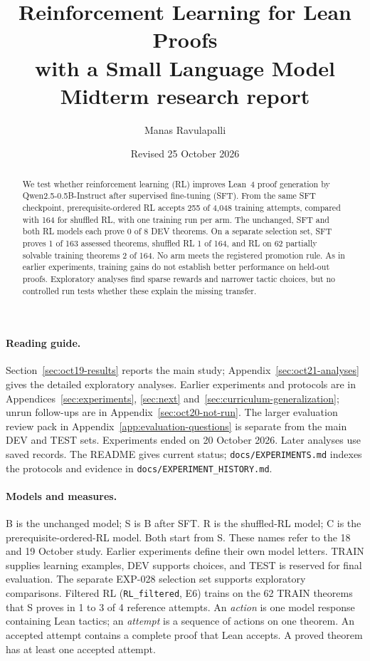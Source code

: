 \documentclass[11pt]{article}
\title{Reinforcement Learning for Lean Proofs\\with a Small Language Model\\[4pt]
\large Midterm research report}
\author{Manas Ravulapalli}
\date{Revised 25 October 2026}
\newcommand{\code}[1]{\texttt{#1}}
\newcommand{\pth}[1]{\nolinkurl{#1}}
\begin{document}
\maketitle

\begin{abstract}
We test whether reinforcement learning (RL) improves Lean~4 proof generation by Qwen2.5-0.5B-Instruct after supervised fine-tuning (SFT).
From the same SFT checkpoint, prerequisite-ordered RL accepts 255 of 4,048 training attempts, compared with 164 for shuffled RL, with one training run per arm.
The unchanged, SFT and both RL models each prove 0 of 8 DEV theorems.
On a separate selection set, SFT proves 1 of 163 assessed theorems, shuffled RL 1 of 164, and RL on 62 partially solvable training theorems 2 of 164.
No arm meets the registered promotion rule.
As in earlier experiments, training gains do not establish better performance on held-out proofs.
Exploratory analyses find sparse rewards and narrower tactic choices, but no controlled run tests whether these explain the missing transfer.
\end{abstract}

\paragraph{Reading guide.}
Section~\ref{sec:oct19-results} reports the main study; Appendix~\ref{sec:oct21-analyses} gives the detailed exploratory analyses.
Earlier experiments and protocols are in Appendices~\ref{sec:experiments}, \ref{sec:next} and~\ref{sec:curriculum-generalization}; unrun follow-ups are in Appendix~\ref{sec:oct20-not-run}.
The larger evaluation review pack in Appendix~\ref{app:evaluation-questions} is separate from the main DEV and TEST sets.
Experiments ended on 20 October 2026. Later analyses use saved records.
The README gives current status; \pth{docs/EXPERIMENTS.md} indexes the protocols and evidence in \pth{docs/EXPERIMENT_HISTORY.md}.

\paragraph{Models and measures.}
B is the unchanged model; S is B after SFT.
R is the shuffled-RL model; C is the prerequisite-ordered-RL model. Both start from S.
These names refer to the 18 and 19 October study. Earlier experiments define their own model letters.
TRAIN supplies learning examples, DEV supports choices, and TEST is reserved for final evaluation.
The separate EXP-028 selection set supports exploratory comparisons.
Filtered RL (\code{RL\_filtered}, E6) trains on the 62 TRAIN theorems that S proves in 1 to 3 of 4 reference attempts.
An \emph{action} is one model response containing Lean tactics; an \emph{attempt} is a sequence of actions on one theorem.
An accepted attempt contains a complete proof that Lean accepts. A proved theorem has at least one accepted attempt.
\end{document}
